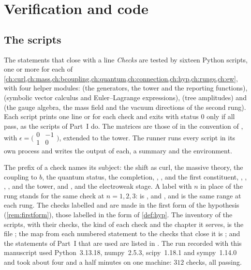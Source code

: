 \chapter{Verification and code}
\label{app:verification}

\section{The scripts}

The statements that close with a line \emph{Checks} are tested by sixteen Python scripts, one or more for each of
\cref{ch:curl,ch:mass,ch:bcoupling,ch:quantum,ch:connection,ch:hyp,ch:rungs,ch:ew}, with four helper modules:  (the
generators, the tower and the reporting functions),  (symbolic vector calculus and Euler--Lagrange expressions),
 (tree amplitudes) and  (the gauge algebra, the mass field and the vacuum directions of the second rung).
Each script prints one line  or  for each check and exits with status $0$ only if all pass,
as the scripts of Part~I do. The matrices are those of  in the convention of , with
$\epsilon=\bigl(\begin{smallmatrix}0&-1\\1&0\end{smallmatrix}\bigr)$, extended to the tower. The runner  runs every script in
its own process and writes the output of each, a summary and the environment.

The prefix of a check names its subject:  the shift as curl,  the massive theory,  the coupling to $b$,  the
quantum status,  the completion, , ,  and  the first constituent, , , ,
,  and  the tower, and ,  and  the electroweak stage. A label with $n$ in place of the rung
stands for the same check at $n=1,2,3$:  is ,  and , and  is the same range
at each rung. The checks labelled  and  are made in the first form of the hypothesis (\cref{rem:firstform}), those labelled
 in the form of \cref{def:hyp}. The inventory of the scripts, with their checks, the kind of each check and the chapter it serves,
is the file ; the map from each numbered statement to the checks that close it is
; and the statements of Part~I that are used are listed in . The
run recorded with this manuscript used Python~3.13.18, numpy~2.5.3, scipy~1.18.1 and sympy~1.14.0 and took about four and a half minutes on
one machine: $312$ checks, all passing.

